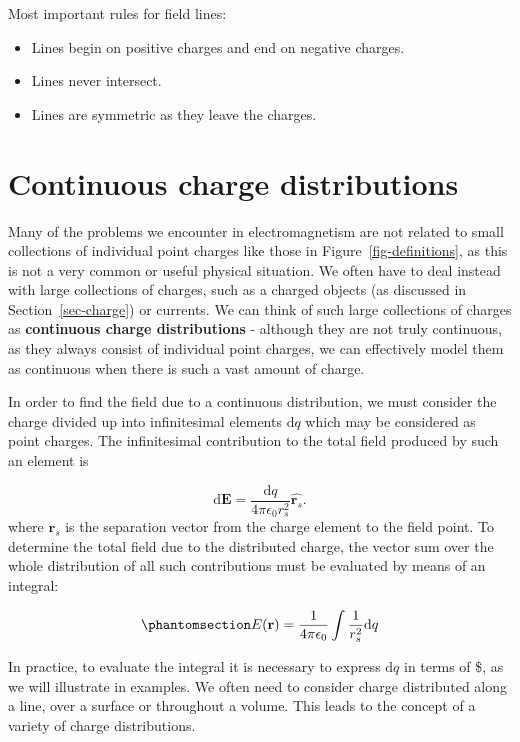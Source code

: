 \documentclass[
  letterpaper,
  DIV=11,
  numbers=noendperiod]{scrreprt}
\begin{document}
Most important rules for field lines:

\begin{itemize}
\item
  Lines begin on positive charges and end on negative charges.
\item
  Lines never intersect.
\item
  Lines are symmetric as they leave the charges.
\end{itemize}

\section{Continuous charge
distributions}\label{continuous-charge-distributions}

Many of the problems we encounter in electromagnetism are not related to
small collections of individual point charges like those in
Figure~\ref{fig-definitions}, as this is not a very common or useful
physical situation. We often have to deal instead with large collections
of charges, such as a charged objects (as discussed in
Section~\ref{sec-charge}) or currents. We can think of such large
collections of charges as \textbf{continuous charge distributions} -
although they are not truly continuous, as they always consist of
individual point charges, we can effectively model them as continuous
when there is such a vast amount of charge.

In order to find the field due to a continuous distribution, we must
consider the charge divided up into infinitesimal elements
\(\mathrm{d}q\) which may be considered as point charges. The
infinitesimal contribution to the total field produced by such an
element is

\[ \mathrm{d}\mathrm{\mathbf{E}}= \frac{\mathrm{d}q}{4\pi\epsilon_0 r_s^2} \hat{\mathrm{\mathbf{r}}_s}.\]
where \(\mathrm{\mathbf{r}}_s\) is the separation vector from the charge
element to the field point. To determine the total field due to the
distributed charge, the vector sum over the whole distribution of all
such contributions must be evaluated by means of an integral:

\begin{equation}\phantomsection\label{eq-infinitesimalE}{ E(\mathrm{\mathbf{r}}) = \frac{1}{4\pi \epsilon_0} \int \frac{1}{r_s^2} \mathrm{d}q }\end{equation}

In practice, to evaluate the integral it is necessary to express
\(\mathrm{d}q\) in terms of \$, as we will illustrate
in examples. We often need to consider charge distributed along a line,
over a surface or throughout a volume. This leads to the concept of a
variety of charge distributions.
\end{document}
